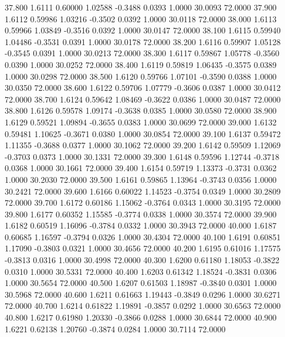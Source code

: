   37.800   1.6111   0.60000   1.02588  -0.3488   0.0393   1.0000  30.0093  72.0000
  37.900   1.6112   0.59986   1.03216  -0.3502   0.0392   1.0000  30.0118  72.0000
  38.000   1.6113   0.59966   1.03849  -0.3516   0.0392   1.0000  30.0147  72.0000
  38.100   1.6115   0.59940   1.04486  -0.3531   0.0391   1.0000  30.0178  72.0000
  38.200   1.6116   0.59907   1.05128  -0.3545   0.0391   1.0000  30.0213  72.0000
  38.300   1.6117   0.59867   1.05778  -0.3560   0.0390   1.0000  30.0252  72.0000
  38.400   1.6119   0.59819   1.06435  -0.3575   0.0389   1.0000  30.0298  72.0000
  38.500   1.6120   0.59766   1.07101  -0.3590   0.0388   1.0000  30.0350  72.0000
  38.600   1.6122   0.59706   1.07779  -0.3606   0.0387   1.0000  30.0412  72.0000
  38.700   1.6124   0.59642   1.08469  -0.3622   0.0386   1.0000  30.0487  72.0000
  38.800   1.6126   0.59578   1.09174  -0.3638   0.0385   1.0000  30.0580  72.0000
  38.900   1.6129   0.59521   1.09894  -0.3655   0.0383   1.0000  30.0699  72.0000
  39.000   1.6132   0.59481   1.10625  -0.3671   0.0380   1.0000  30.0854  72.0000
  39.100   1.6137   0.59472   1.11355  -0.3688   0.0377   1.0000  30.1062  72.0000
  39.200   1.6142   0.59509   1.12069  -0.3703   0.0373   1.0000  30.1331  72.0000
  39.300   1.6148   0.59596   1.12744  -0.3718   0.0368   1.0000  30.1661  72.0000
  39.400   1.6154   0.59719   1.13373  -0.3731   0.0362   1.0000  30.2030  72.0000
  39.500   1.6161   0.59865   1.13964  -0.3743   0.0356   1.0000  30.2421  72.0000
  39.600   1.6166   0.60022   1.14523  -0.3754   0.0349   1.0000  30.2809  72.0000
  39.700   1.6172   0.60186   1.15062  -0.3764   0.0343   1.0000  30.3195  72.0000
  39.800   1.6177   0.60352   1.15585  -0.3774   0.0338   1.0000  30.3574  72.0000
  39.900   1.6182   0.60519   1.16096  -0.3784   0.0332   1.0000  30.3943  72.0000
  40.000   1.6187   0.60685   1.16597  -0.3794   0.0326   1.0000  30.4304  72.0000
  40.100   1.6191   0.60851   1.17090  -0.3803   0.0321   1.0000  30.4656  72.0000
  40.200   1.6195   0.61016   1.17575  -0.3813   0.0316   1.0000  30.4998  72.0000
  40.300   1.6200   0.61180   1.18053  -0.3822   0.0310   1.0000  30.5331  72.0000
  40.400   1.6203   0.61342   1.18524  -0.3831   0.0306   1.0000  30.5654  72.0000
  40.500   1.6207   0.61503   1.18987  -0.3840   0.0301   1.0000  30.5968  72.0000
  40.600   1.6211   0.61663   1.19443  -0.3849   0.0296   1.0000  30.6271  72.0000
  40.700   1.6214   0.61822   1.19891  -0.3857   0.0292   1.0000  30.6563  72.0000
  40.800   1.6217   0.61980   1.20330  -0.3866   0.0288   1.0000  30.6844  72.0000
  40.900   1.6221   0.62138   1.20760  -0.3874   0.0284   1.0000  30.7114  72.0000
